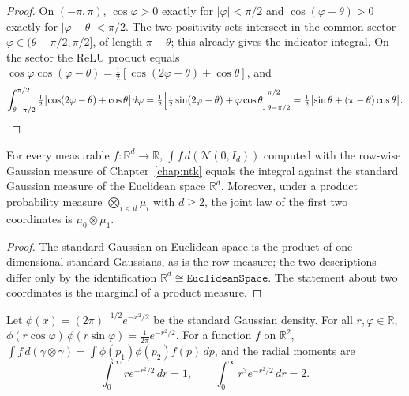 \begin{proof}
  \leanok
On $(-\pi,\pi)$, $\cos\varphi>0$ exactly for $|\varphi|<\pi/2$ and $\cos(\varphi-\theta)>0$ exactly for
$|\varphi-\theta|<\pi/2$. The two positivity sets intersect in the common sector
$\varphi\in(\theta-\pi/2,\pi/2]$, of length $\pi-\theta$; this already gives the indicator integral.
On the sector the ReLU product equals $\cos\varphi\cos(\varphi-\theta)=\tfrac12[\cos(2\varphi-\theta)+\cos\theta]$, and
\[
  \int_{\theta-\pi/2}^{\pi/2}\tfrac12\bigl[\cos(2\varphi-\theta)+\cos\theta\bigr]d\varphi
  =\tfrac12\Bigl[\tfrac12\sin(2\varphi-\theta)+\varphi\cos\theta\Bigr]_{\theta-\pi/2}^{\pi/2}
  =\tfrac12\bigl[\sin\theta+(\pi-\theta)\cos\theta\bigr].
\]
\end{proof}

\begin{lemma}\label{lem:ntkr:pushforward}
  \leanok
For every measurable $f:\mathbb R^d\to\mathbb R$, $\int f\,d(\mathcal N(0,I_d))$ computed with the
row-wise Gaussian measure of Chapter~\ref{chap:ntk} equals the integral against the standard
Gaussian measure of the Euclidean space $\mathbb R^d$. Moreover, under a product probability
measure $\bigotimes_{i<d}\mu_i$ with $d\ge2$, the joint law of the first two coordinates is
$\mu_0\otimes\mu_1$.
\end{lemma}

\begin{proof}
  \leanok
The standard Gaussian on Euclidean space is the product of one-dimensional standard Gaussians, as is
the row measure; the two descriptions differ only by the identification $\mathbb R^d\cong\texttt{EuclideanSpace}$.
The statement about two coordinates is the marginal of a product measure.
\end{proof}

\begin{lemma}\label{lem:ntkr:polarDensity}
  \leanok
Let $\phi(x)=(2\pi)^{-1/2}e^{-x^2/2}$ be the standard Gaussian density. For all $r,\varphi\in\mathbb R$,
$\phi(r\cos\varphi)\,\phi(r\sin\varphi)=\frac1{2\pi}e^{-r^2/2}$. For a function $f$ on $\mathbb R^2$,
$\int f\,d(\gamma\otimes\gamma)=\int\phi(p_1)\phi(p_2)f(p)\,dp$, and the radial moments are
\[
  \int_0^\infty re^{-r^2/2}\,dr=1,\qquad\int_0^\infty r^3e^{-r^2/2}\,dr=2 .
\]
\end{lemma}

